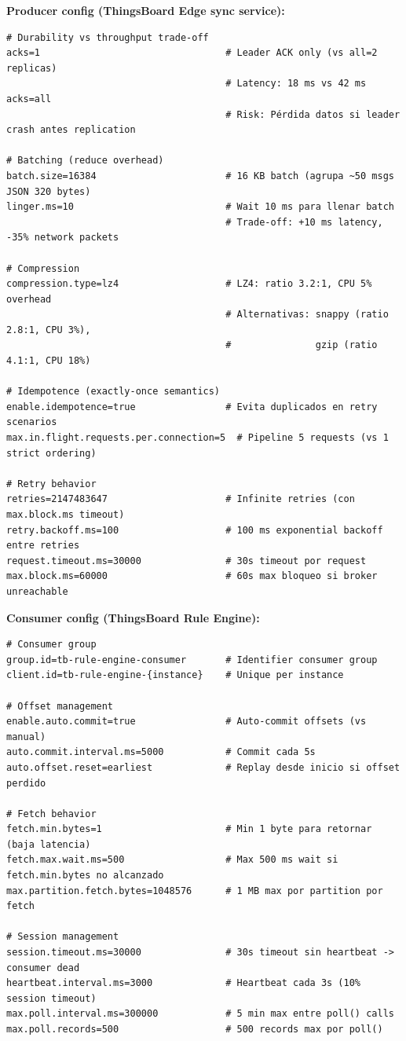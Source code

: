 \textbf{Producer config (ThingsBoard Edge sync service):}

\begin{verbatim}
# Durability vs throughput trade-off
acks=1                                 # Leader ACK only (vs all=2 replicas)
                                       # Latency: 18 ms vs 42 ms acks=all
                                       # Risk: Pérdida datos si leader crash antes replication

# Batching (reduce overhead)
batch.size=16384                       # 16 KB batch (agrupa ~50 msgs JSON 320 bytes)
linger.ms=10                           # Wait 10 ms para llenar batch
                                       # Trade-off: +10 ms latency, -35% network packets

# Compression
compression.type=lz4                   # LZ4: ratio 3.2:1, CPU 5% overhead
                                       # Alternativas: snappy (ratio 2.8:1, CPU 3%), 
                                       #               gzip (ratio 4.1:1, CPU 18%)

# Idempotence (exactly-once semantics)
enable.idempotence=true                # Evita duplicados en retry scenarios
max.in.flight.requests.per.connection=5  # Pipeline 5 requests (vs 1 strict ordering)

# Retry behavior
retries=2147483647                     # Infinite retries (con max.block.ms timeout)
retry.backoff.ms=100                   # 100 ms exponential backoff entre retries
request.timeout.ms=30000               # 30s timeout por request
max.block.ms=60000                     # 60s max bloqueo si broker unreachable
\end{verbatim}

\textbf{Consumer config (ThingsBoard Rule Engine):}

\begin{verbatim}
# Consumer group
group.id=tb-rule-engine-consumer       # Identifier consumer group
client.id=tb-rule-engine-{instance}    # Unique per instance

# Offset management
enable.auto.commit=true                # Auto-commit offsets (vs manual)
auto.commit.interval.ms=5000           # Commit cada 5s
auto.offset.reset=earliest             # Replay desde inicio si offset perdido

# Fetch behavior
fetch.min.bytes=1                      # Min 1 byte para retornar (baja latencia)
fetch.max.wait.ms=500                  # Max 500 ms wait si fetch.min.bytes no alcanzado
max.partition.fetch.bytes=1048576      # 1 MB max por partition por fetch

# Session management
session.timeout.ms=30000               # 30s timeout sin heartbeat -> consumer dead
heartbeat.interval.ms=3000             # Heartbeat cada 3s (10% session timeout)
max.poll.interval.ms=300000            # 5 min max entre poll() calls
max.poll.records=500                   # 500 records max por poll()
\end{verbatim}

